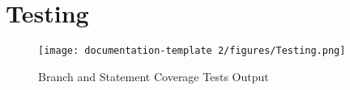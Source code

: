 \section{Testing}




\begin{figure}
    \centering
    \texttt{[image: documentation-template 2/figures/Testing.png]}
    \caption{Branch and Statement Coverage Tests Output }
    \label{fig:enter-label}
\end{figure}